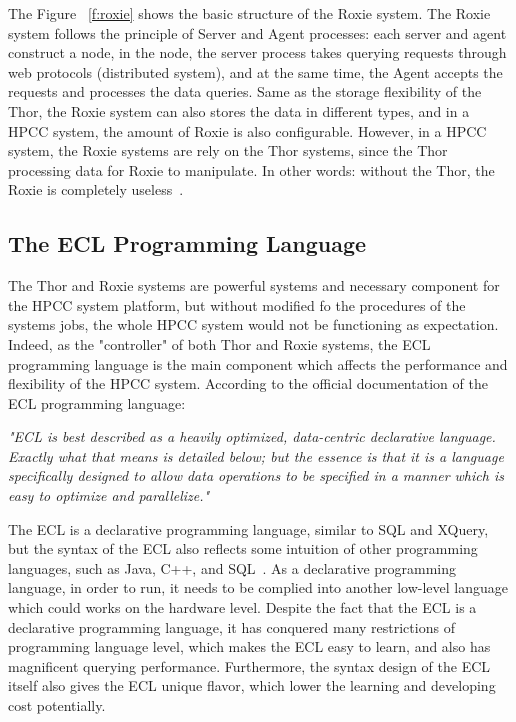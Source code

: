 The Figure ~\ref{f:roxie} shows the basic structure of the Roxie system. The Roxie system follows the principle of Server and Agent processes: each server and agent construct a node, in the node, the server process takes querying requests through web protocols (distributed system), and at the same time, the Agent accepts the requests and processes the data queries. Same as the storage flexibility of the Thor, the Roxie system can also stores the data in different types, and in a HPCC system, the amount of Roxie is also configurable. However, in a HPCC system, the Roxie systems are rely on the Thor systems, since the Thor processing data for Roxie to manipulate. In other words: without the Thor, the Roxie is completely useless~\cite{Intro4}.

\subsection{The ECL Programming Language}
The Thor and Roxie systems are powerful systems and necessary component for the HPCC system platform, but without modified fo the procedures of the systems jobs, the whole HPCC system would not be functioning as expectation. Indeed, as the "controller" of both Thor and Roxie systems, the ECL programming language is the main component which affects the performance and flexibility of the HPCC system. According to the official documentation of the ECL programming language:
\begin{center}
\textit{"ECL is best described as a heavily optimized, data-centric declarative language. Exactly
what that means is detailed below; but the essence is that it is a language specifically designed to allow data
operations to be specified in a manner which is easy to optimize and parallelize."}~\cite{ECL}
\end{center}
The ECL is a declarative programming language, similar to SQL and XQuery, but the syntax of the ECL also reflects some intuition of other programming languages, such as Java, C++, and SQL~\cite{ECL}. As a declarative programming language, in order to run, it needs to be complied into another low-level language which could works on the hardware level. Despite the fact that the ECL is a declarative programming language, it has conquered many restrictions of programming language level, which makes the ECL easy to learn, and also has magnificent querying performance. Furthermore, the syntax design of the ECL itself also gives the ECL unique flavor, which lower the learning and developing cost potentially. ~\cite{ECL}

